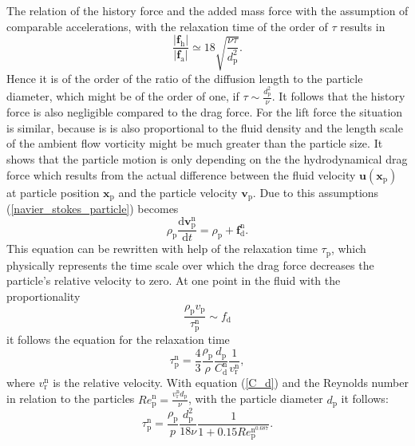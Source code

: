 \documentclass[11pt,a4paper,openany,oneside,parskip=half*]{article}
\renewcommand*\vec[1]{\boldsymbol{#1}}
\begin{document}
The relation of the history force and the added mass force with the assumption of comparable accelerations, with the relaxation time of the order of $\tau$ results in
\begin{equation}
\frac{|\vec{f}_\mathrm{h}|}{|\vec{f}_\mathrm{a}|}\simeq 18 \sqrt{\frac{\nu\tau}{d_\mathrm{p}^\mathrm{2}}}.
\end{equation}
Hence it is of the order of the ratio of the diffusion length to the particle diameter, which might be of the order of one, if $\tau \sim \frac{d_\mathrm{p}^\mathrm{2}}{\nu}$.
It follows that the history force is also negligible compared to the drag force.
For the lift force the situation is similar, because is is also proportional to the fluid density and the length scale of the ambient flow vorticity might be much greater than the particle size.
It shows that the particle motion is only depending on the the hydrodynamical drag force which results from the actual difference between the fluid velocity $\vec{u}(\vec{x}_\mathrm{p})$ at particle position $\vec{x}_\mathrm{p}$ and the particle velocity $\vec{v}_\mathrm{p}$.
Due to this assumptions (\ref{navier_stokes_particle}) becomes
\begin{equation}
\rho_\mathrm{p}\frac{\mathrm{d}\vec{v}_\mathrm{p}^\mathrm{n}}{\mathrm{d}t} = \rho_\mathrm{p}+\vec{f}_\mathrm{d}^\mathrm{n}.
\end{equation}
This equation can be rewritten with help of the relaxation time $\tau_\mathrm{p}$, which physically represents the time scale over which the drag force decreases the particle's relative velocity to zero. At one point in the fluid with the proportionality 
\begin{equation}
\frac{\rho_\mathrm{p} v_\mathrm{p}}{\tau_\mathrm{p}^\mathrm{n}} \sim f_\mathrm{d}
\end{equation} 
it follows the equation for the relaxation time
\begin{equation}
\tau_\mathrm{p}^\mathrm{n} = \frac{4}{3}\frac{\rho_\mathrm{p}}{\rho} \frac{d_\mathrm{p}}{C_\mathrm{d}^\mathrm{n}}\frac{1}{v_\mathrm{r}^\mathrm{n}},
\end{equation}
where $v_\mathrm{r}^\mathrm{n}$ is the relative velocity. 
With equation (\ref{C_d}) and the Reynolds number in relation to the particles $Re_\mathrm{p}^\mathrm{n}=\frac{v_\mathrm{r}^\mathrm{n}d_\mathrm{p}}{\nu}$, with the particle diameter $d_\mathrm{p}$ it follows:
\begin{equation}
\tau_\mathrm{p}^\mathrm{n} = \frac{\rho_\mathrm{p}}{p}\frac{d_\mathrm{p}^2}{18\nu}\frac{1}{1+0.15Re_\mathrm{p}^\mathrm{n^\mathrm{0.687}}}.
\end{equation} 
\end{document}
